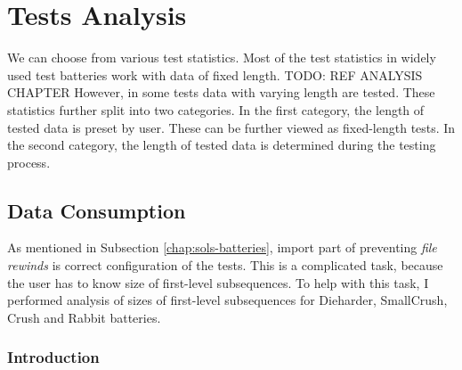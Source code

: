 \documentclass[
  digital,     %
  oneside,     %
  nosansbold,  %
  nocolorbold, %
  nolof,         %
  nolot,         %
]{fithesis4}
\begin{document}




\chapter{Tests Analysis} 
We can choose from various test statistics. Most of the test statistics in widely used test batteries work with data of fixed length. TODO: REF ANALYSIS CHAPTER However, in some tests data with varying length are tested. These statistics further split into two categories. In the first category, the length of tested data is preset by user. These can be further viewed as fixed-length tests. In the second category, the length of tested data is determined during the testing process.



\section{Data Consumption} \label{chap:analysis-data}


As mentioned in Subsection \ref{chap:sols-batteries}, import part of preventing \emph{file rewinds} is correct configuration of the tests. This is a complicated task, because the user has to know size of first-level subsequences. To help with this task, I performed analysis of sizes of first-level subsequences for Dieharder, SmallCrush, Crush and Rabbit batteries.  %

\subsection{Introduction} \label{chap:analysis-data-intro}
\end{document}
